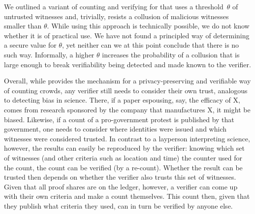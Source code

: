We outlined a variant of counting and verifying for \CROCUS that uses
a threshold~\(\theta\) of untrusted witnesses and, trivially, resists
a collusion of malicious witnesses smaller than \(\theta\).  While
using this approach is technically possible, we do not know whether it
is of practical use. We have not found a principled way of determining
a secure value for \(\theta\), yet neither can we at this point
conclude that there is no such way. Informally, a higher \(\theta\)
increases the probability of a collusion that is large enough to break
verifiability being detected and made known to the verifier. 

Overall, while \CROCUS provides the mechanism for a privacy-preserving
and verifiable way of counting crowds, any verifier still needs to
consider their own trust, analogous to detecting bias in
science. There, if a paper espousing, say, the efficacy of X, comes
from research sponsored by the company that manufactures X, it might
be biased. Likewise, if a count of a pro-government protest is
published by that government, one needs to consider where identities
were issued and which witnesses were considered trusted. In contrast
to a layperson interpreting science, however, the results can easily
be reproduced by the verifier: knowing which set of witnesses (and
other criteria such as location and time) the counter used for the
count, the count can be verified (by a re-count).  Whether the result
can be trusted then depends on whether the verifier also trusts this
set of witnesses. Given that all proof shares are on the ledger,
however, a verifier can come up with their own criteria and make a
count themselves. This count then, given that they publish what
criteria they used, can in turn be verified by anyone else.










